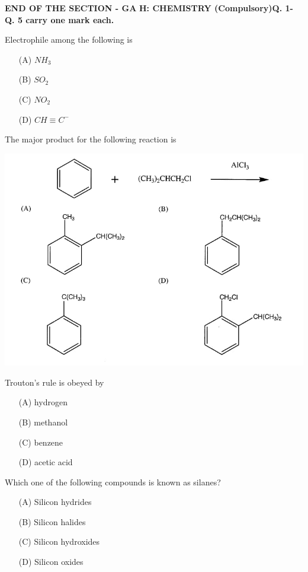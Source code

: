 \documentclass[journal]{IEEEtran}
\begin{document}
	\textbf{END OF THE SECTION - GA}
\newpage
	\textbf{H: CHEMISTRY (Compulsory)\newline Q. 1- Q. 5 carry one mark each.}
\begin{enumerate}
	\item{ Electrophile among the following is
		\begin{itemize}
			\item[(A)] $NH_3$
			\item[(B)] $SO_2$
			\item[(C)] $NO_2$
			\item[(D)] $CH \equiv C^-$

		\end{itemize}
	\item{ The major product for the following reaction is}
	
	\includegraphics[width=\textwidth]{3}
	\item{ Trouton's rule is obeyed by}
		\begin{itemize}
			\item[(A)] hydrogen
			\item[(B)] methanol
			\item[(C)] benzene
			\item[(D)] acetic acid

		\end{itemize}
	\item{ Which one of the following compounds is known as silanes?}
		\begin{itemize}
			\item[(A)] Silicon hydrides
			\item[(B)] Silicon halides
			\item[(C)] Silicon hydroxides
			\item[(D)] Silicon oxides


\end{itemize}}
\end{enumerate}
\end{document}
